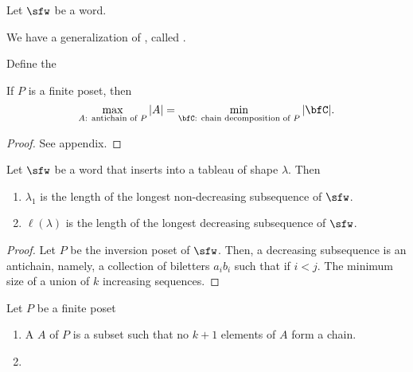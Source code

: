 \documentclass{article}
\begin{document}
\begin{definition}
    Let $\sfw$ be a word.
\end{definition}

\begin{lemma}
\end{lemma}

We have a generalization of , called .

Define the 
\begin{theorem}
    \label{thm:Dilworth}
    If $P$ is a finite poset, then 
    \[
        \max_\text{$A$: antichain of $P$}
        |A|
        =
        \min_\text{$\bfC$: chain decomposition of $P$}
        |\bfC|.
    \]
\end{theorem}

\begin{proof}
    See appendix.
\end{proof}

\begin{corollary}
    Let $\sfw$ be a word that inserts into a tableau of shape $\lambda$.
    Then 
    \begin{enumerate}[label=(\alph*)]
        \item 
            $\lambda_1$ is the length of the longest non-decreasing subsequence of $\sfw$.
        \item 
            $\ell(\lambda)$ is the length of the longest decreasing subsequence of $\sfw$.
    \end{enumerate}
\end{corollary}

\begin{proof}
    Let $P$ be the inversion poset of $\sfw$.
    Then, a decreasing subsequence is an antichain, namely, a collection of biletters $a_ib_i$ such that if $i < j$.
    The minimum size of a union of $k$ increasing sequences.
\end{proof}

\begin{definition}
    Let $P$ be a finite poset
    \begin{enumerate}[label=(\alph*)]
        \item 
            A  $A$ of $P$ is a subset such that no $k+1$ elements of $A$ form a chain.
        \item 
            
    \end{enumerate}
\end{definition}
\end{document}
